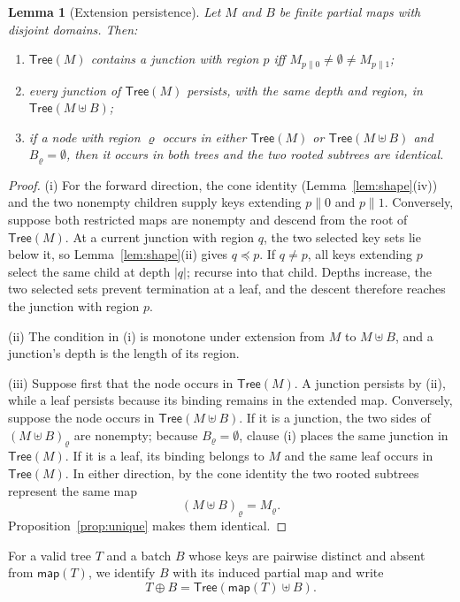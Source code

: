 \documentclass[11pt]{article}
\newtheorem{lemma}{Lemma}
\begin{document}
\begin{lemma}[Extension persistence]
\label{lem:persist}
Let $M$ and $B$ be finite partial maps with disjoint domains. Then:
\begin{enumerate}[nosep,label=(\roman*)]
  \item $\mathsf{Tree}(M)$ contains a junction with region $p$ iff $M_{p\|0} \neq \emptyset \neq M_{p\|1}$;
  \item every junction of $\mathsf{Tree}(M)$ persists, with the same depth and region, in $\mathsf{Tree}(M \uplus B)$;
  \item if a node with region $\varrho$ occurs in either $\mathsf{Tree}(M)$ or $\mathsf{Tree}(M \uplus B)$ and $B_\varrho = \emptyset$, then it occurs in both trees and the two rooted subtrees are identical.
\end{enumerate}
\end{lemma}
\begin{proof}
(i) For the forward direction, the cone identity (Lemma~\ref{lem:shape}(iv)) and the two nonempty children supply keys extending $p\|0$ and $p\|1$. Conversely, suppose both restricted maps are nonempty and descend from the root of $\mathsf{Tree}(M)$. At a current junction with region $q$, the two selected key sets lie below it, so Lemma~\ref{lem:shape}(ii) gives $q \preceq p$. If $q \neq p$, all keys extending $p$ select the same child at depth $|q|$; recurse into that child. Depths increase, the two selected sets prevent termination at a leaf, and the descent therefore reaches the junction with region $p$.

(ii) The condition in (i) is monotone under extension from $M$ to $M \uplus B$, and a junction's depth is the length of its region.

(iii) Suppose first that the node occurs in $\mathsf{Tree}(M)$. A junction persists by (ii), while a leaf persists because its binding remains in the extended map. Conversely, suppose the node occurs in $\mathsf{Tree}(M \uplus B)$. If it is a junction, the two sides of $(M \uplus B)_\varrho$ are nonempty; because $B_\varrho=\emptyset$, clause (i) places the same junction in $\mathsf{Tree}(M)$. If it is a leaf, its binding belongs to $M$ and the same leaf occurs in $\mathsf{Tree}(M)$. In either direction, by the cone identity the two rooted subtrees represent the same map
\[
  (M \uplus B)_\varrho=M_\varrho.
\]
Proposition~\ref{prop:unique} makes them identical.
\end{proof}

For a valid tree $T$ and a batch $B$ whose keys are pairwise distinct and absent from $\mathsf{map}(T)$, we identify $B$ with its induced partial map and write
\[
  T \oplus B = \mathsf{Tree}(\mathsf{map}(T) \uplus B).
\]
\end{document}
